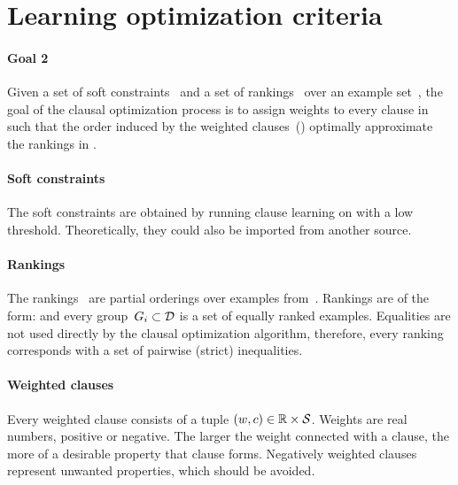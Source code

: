 
\section{Learning optimization criteria}
\label{sec:learning_user_preferences}
\label{sec:learning_optimization_criteria}


\begin{framed}
	\noindent
	\begin{minipage}{\textwidth}
		\paragraph{Goal 2}
		Given a set of soft constraints~ and a set of rankings~ over an example set~, the goal of the clausal optimization process is to assign weights to every clause in~ such that the order induced by the weighted clauses~() optimally approximate the rankings in .
	\end{minipage}
\end{framed}

\paragraph{Soft constraints}
The soft constraints are obtained by running clause learning on  with a low threshold.
Theoretically, they could also be imported from another source.

\paragraph{Rankings}
The rankings~ are partial orderings over examples from~.
Rankings are of the form:  and every group~$G_i \subset \mathcal{D}$ is a set of equally ranked examples. Equalities are not used directly by the clausal optimization algorithm, therefore, every ranking corresponds with a set of pairwise (strict) inequalities.

\paragraph{Weighted clauses}
Every weighted clause consists of a tuple $(w, c) \in \mathbb{R} \times \mathcal{S}$.
Weights are real numbers, positive or negative.
The larger the weight connected with a clause, the more of a desirable property that clause forms.
Negatively weighted clauses represent unwanted properties, which should be avoided.

